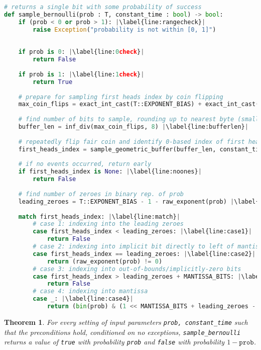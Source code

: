 \documentclass[11pt,a4paper]{article}
\newtheorem{theorem}{Theorem}[section]
\theoremstyle{definition}
\begin{document}
\begin{lstlisting}[language=Python, escapechar=|]
# returns a single bit with some probability of success
def sample_bernoulli(prob : T, constant_time : bool) -> bool:
    if (prob < 0 or prob > 1): |\label{line:rangecheck}|
        raise Exception("probability is not within [0, 1]")
        
            
    if prob is 0: |\label{line:0check}|
        return False
        
    if prob is 1: |\label{line:1check}|
        return True
        
    # prepare for sampling first heads index by coin flipping
    max_coin_flips = exact_int_cast(T::EXPONENT_BIAS) + exact_int_cast(T::MANTISSA_BITS) |\label{line:maxcoinflips}|
    
    # find number of bits to sample, rounding up to nearest byte (smallest sample size)
    buffer_len = inf_div(max_coin_flips, 8) |\label{line:bufferlen}|
    
    # repeatedly flip fair coin and identify 0-based index of first heads
    first_heads_index = sample_geometric_buffer(buffer_len, constant_time) |\label{line:sampling}|
    
    # if no events occurred, return early
    if first_heads_index is None: |\label{line:noones}|
        return False
    
    # find number of zeroes in binary rep. of prob
    leading_zeroes = T::EXPONENT_BIAS - 1 - raw_exponent(prob) |\label{line:leadingzeroes}|
    
    match first_heads_index: |\label{line:match}|
        # case 1: indexing into the leading zeroes
        case first_heads_index < leading_zeroes: |\label{line:case1}|
            return False
        # case 2: indexing into implicit bit directly to left of mantissa
        case first_heads_index == leading_zeroes: |\label{line:case2}|
            return (raw_exponent(prob) != 0)
        # case 3: indexing into out-of-bounds/implicitly-zero bits
        case first_heads_index > leading_zeroes + MANTISSA_BITS: |\label{line:case3}|
            return False
        # case 4: indexing into mantissa
        case _: |\label{line:case4}|
            return (bin(prob) & (1 << MANTISSA_BITS + leading_zeroes - first_heads_index))

\end{lstlisting}

\begin{tcolorbox}
\begin{theorem} For every setting of input parameters \texttt{prob, constant\_time} such that the preconditions hold, conditioned on no exceptions, \texttt{sample\_bernoulli} returns a value of \texttt{true} with probability \texttt{prob} and \texttt{false} with probability $1 - \texttt{prob}$. 
\end{theorem}
\end{tcolorbox}
\end{document}
